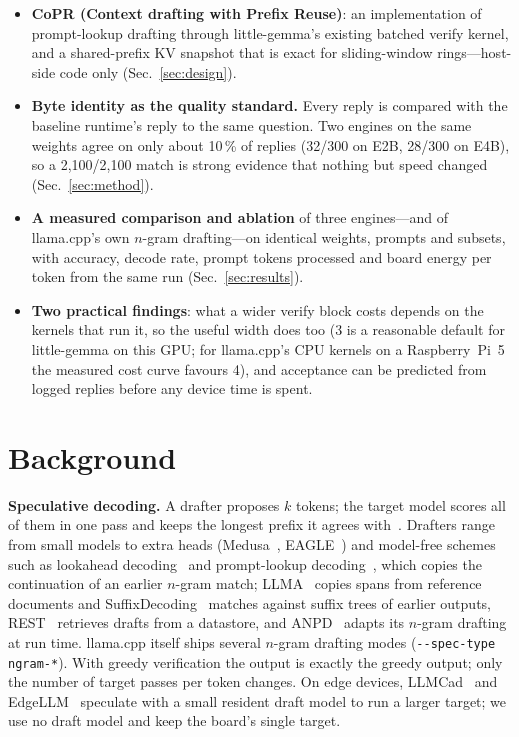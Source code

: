 \documentclass[conference]{IEEEtran}
\newcommand{\sys}{CoPR}
\newcommand{\lc}{llama.cpp}
\newcommand{\lgm}{little-gemma}
\begin{document}
\begin{itemize}
\item \textbf{\sys{} (Context drafting with Prefix Reuse)}: an implementation of prompt-lookup drafting through
\lgm{}'s existing batched verify kernel, and a shared-prefix KV snapshot that is
exact for sliding-window rings---host-side code only (Sec.~\ref{sec:design}).
\item \textbf{Byte identity as the quality standard.} Every reply is compared
with the baseline runtime's reply to the same question. Two engines on the same
weights agree on only about 10\,\% of replies (32/300 on E2B, 28/300 on E4B),
so a 2{,}100/2{,}100 match is strong evidence that nothing but speed changed
(Sec.~\ref{sec:method}).
\item \textbf{A measured comparison and ablation} of three engines---and of
\lc{}'s own $n$-gram drafting---on identical
weights, prompts and subsets, with accuracy, decode rate, prompt
tokens processed and board energy per token from the same run
(Sec.~\ref{sec:results}).
\item \textbf{Two practical findings}: what a wider verify block costs depends
on the kernels that run it, so the useful width does too (3 is a reasonable
default for \lgm{} on this GPU; for \lc{}'s CPU kernels on a Raspberry~Pi~5 the
measured cost curve favours 4), and acceptance can be predicted from logged
replies before any device time is spent.
\end{itemize}

\section{Background}

\textbf{Speculative decoding.} A drafter proposes $k$ tokens; the target model
scores all of them in one pass and keeps the longest prefix it agrees
with~\cite{leviathan2023,chen2023}. Drafters range from small models to extra
heads (Medusa~\cite{medusa}, EAGLE~\cite{eagle}) and model-free schemes such as
lookahead decoding~\cite{lookahead} and prompt-lookup decoding~\cite{pld}, which
copies the continuation of an earlier $n$-gram match; LLMA~\cite{llma} copies
spans from reference documents and SuffixDecoding~\cite{suffixdecoding} matches
against suffix trees of earlier outputs, REST~\cite{rest} retrieves drafts from
a datastore, and ANPD~\cite{anpd} adapts its $n$-gram drafting at run time.
\lc{} itself ships several $n$-gram drafting modes
(\texttt{-{}-spec-type ngram-*}). With greedy verification
the output is exactly the greedy output; only the number of target passes per
token changes. On edge devices, LLMCad~\cite{llmcad} and EdgeLLM~\cite{edgellm}
speculate with a small resident draft model to run a larger target; we use no
draft model and keep the board's single target.
\end{document}
